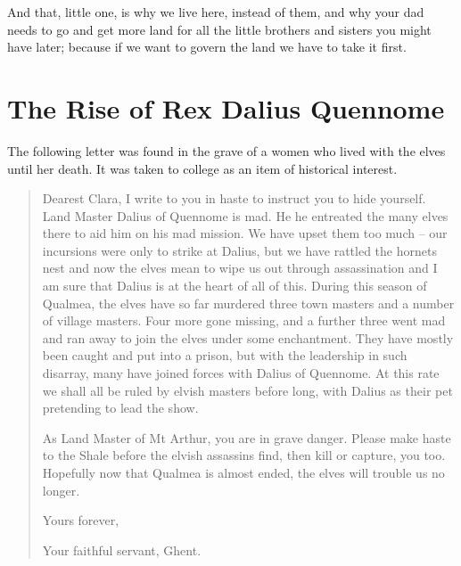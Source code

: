 \begin{multicols}{2}
\begin{exampletext}
And that, little one, is why we live here, instead of them, and why your dad needs to go and get more land for all the little brothers and sisters you might have later; because if we want to govern the land we have to take it first.

\end{exampletext}

\end{multicols}

\section{The Rise of Rex Dalius Quennome}

\begin{multicols}{2}
\label{h_dalius}

\noindent The following letter was found in the grave of a women who lived with the elves until her death.
It was taken to \gls{college} as an item of historical interest.

\begin{quotation}

	Dearest Clara, I write to you in haste to instruct you to hide yourself.
	Land Master Dalius of Quennome is mad.
	He he entreated the many elves there to aid him on his mad mission.
	We have upset them too much -- our incursions were only to strike at Dalius, but we have rattled the hornets nest and now the elves mean to wipe us out through assassination and I am sure that Dalius is at the heart of all of this.
	During this season of Qualmea, the elves have so far murdered three town masters and a number of village masters.
	Four more gone missing, and a further three went mad and ran away to join the elves under some enchantment.
	They have mostly been caught and put into a prison, but with the leadership in such disarray, many have joined forces with Dalius of Quennome.
	At this rate we shall all be ruled by elvish masters before long, with Dalius as their pet pretending to lead the show.

	As Land Master of Mt Arthur, you are in grave danger.
	Please make haste to the Shale before the elvish assassins find, then kill or capture, you too.
	Hopefully now that Qualmea is almost ended, the elves will trouble us no longer.

	Yours forever,

	Your faithful servant, Ghent.

\end{quotation}


\end{multicols}

